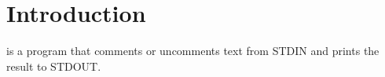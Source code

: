 \section{Introduction}

 is a program that comments or uncomments text from STDIN and prints the result to STDOUT.
